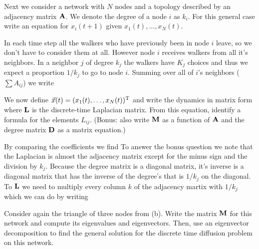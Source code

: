 \subquestion
Next we consider a network with $N$ nodes and a topology described by an adjacency matrix $\bf A$. We denote the degree of a node $i$ as $k_i$. 
For this general case write an equation for $x_i(t+1)$ given $x_1(t),\ldots,x_N(t)$.

\solution 
In each time step all the walkers who have previously been in node $i$ leave, so we don't have to consider them at all. However node $i$ receives walkers from all it's neighbors. In a neighbor $j$ of degree $k_j$ the walkers have $K_j$ choices and thus we expect a proportion $1/k_j$ to go to node $i$. Summing over all of $i$'s neighbors ($\sum A_{ij}$) we write

\subquestion
We now define $\vec{x}(t)=(x_1(t),\ldots ,x_N(t))^{\rm T}$ and write the dynamics in matrix form 
where $\bf L$ is the discrete-time Laplacian matrix.
From this equation, identify a formula for the elements $L_{ij}$. (Bonus: also write $\bf M$ as a function of $\bf A$ and the degree matrix $\bf D$ as a matrix equation.) 

\solution
By comparing the coefficients we find 
To answer the bonus question we note that the Laplacian is almost the adjacency matrix except for the minus sign and the division by $k_j$. Because the degree matrix is a diagonal matrix, it's inverse is a diagonal matrix that has the inverse of the degree's that is $1/k_j$ on the diagonal. To $\bf L$ we need to multiply every column $k$ of the adjacency martix with $1/k_j$ which we can do by writing 

\subquestion
Consider again the triangle of three nodes from (b). Write the matrix $\bf M$ for this network and compute its eigenvalues and eigenvectors. Then, use an eigenvector decomposition to find the general solution for the discrete time diffusion problem on this network. 

